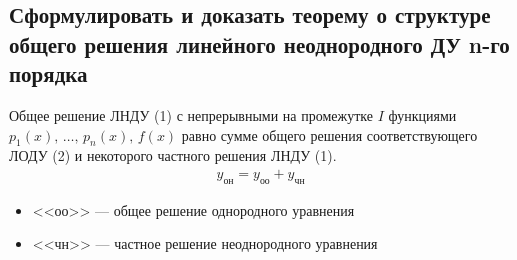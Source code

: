 \newpage
\subsection{Сформулировать и доказать теорему о структуре общего решения линейного неоднородного ДУ n-го порядка}

\begin{theorem*}
    Общее решение ЛНДУ (1) с непрерывными на промежутке $I$ функциями\break $p_1(x),\, \ldots,\, p_n(x),\, f(x)$ равно сумме общего решения соответствующего ЛОДУ (2) и некоторого частного решения ЛНДУ (1).
    \begin{gather}
        \boxed{y_{\text{он}} = y_{\text{оо}} + y_{\text{чн}}}
    \end{gather}
    \begin{itemize}
        \item <<оо>> --- общее решение однородного уравнения
        \item <<чн>> --- частное решение неоднородного уравнения
    \end{itemize}
\end{theorem*}
